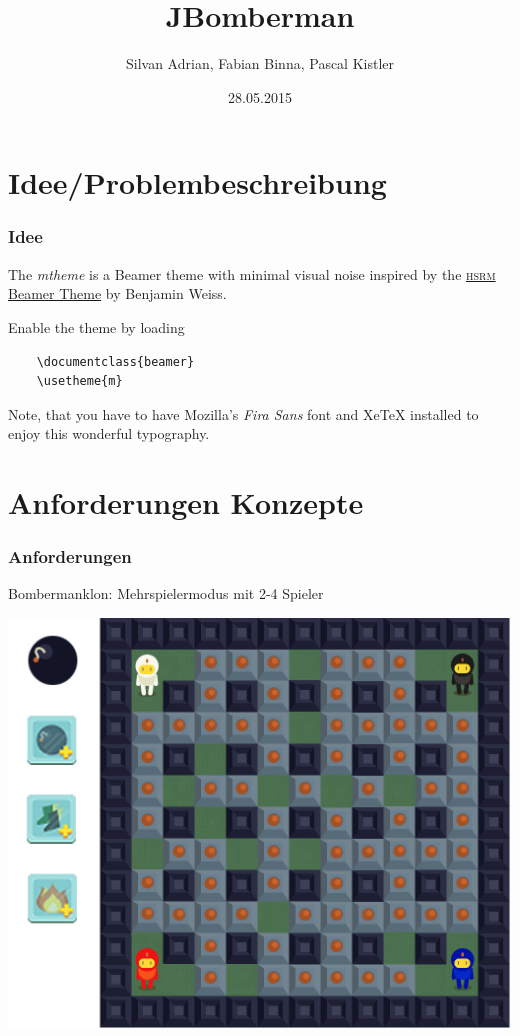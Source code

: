 \documentclass[10pt, compress]{beamer}
\title{JBomberman}
\subtitle{}
\date{28.05.2015}
\author{Silvan Adrian, Fabian Binna, Pascal Kistler}
\institute{Hochschule für Technik Rapperswil}
\begin{document}
\maketitle

\section{Idee/Problembeschreibung}
\begin{frame}[fragile]
  \frametitle{Idee}

  The \emph{mtheme} is a Beamer theme with minimal visual noise inspired by the
  \href{https://github.com/hsrmbeamertheme/hsrmbeamertheme}{\textsc{hsrm} Beamer
  Theme} by Benjamin Weiss.

  Enable the theme by loading

  \begin{verbatim}    \documentclass{beamer}
    \usetheme{m}\end{verbatim}

  Note, that you have to have Mozilla's \emph{Fira Sans} font and XeTeX
  installed to enjoy this wonderful typography.
\end{frame}



\section{Anforderungen  Konzepte}

\begin{frame}[fragile]
	\frametitle{Anforderungen}
	Bombermanklon: Mehrspielermodus mit 2-4 Spieler
	\begin{center}
	\includegraphics[scale=0.8]{bombermangame.png}
	\end{center}

\end{frame}
\end{document}
